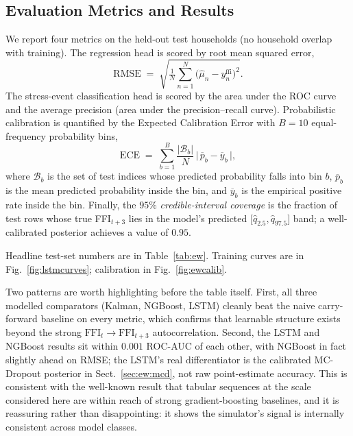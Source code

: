 \documentclass[colorlinks,balance]{asmeconf}
\begin{document}
\subsection{Evaluation Metrics and Results}\label{sec:ew:res}
We report four metrics on the held-out test households (no household overlap with training). The regression head is scored by root mean squared error,
\begin{equation}\label{eq:rmse}
\mathrm{RMSE} \;=\; \sqrt{\tfrac{1}{N}\textstyle\sum_{n=1}^{N}\!\big(\hat\mu_n - y^{\text{ffi}}_n\big)^2}.
\end{equation}
The stress-event classification head is scored by the area under the ROC curve and the average precision (area under the precision--recall curve). Probabilistic calibration is quantified by the Expected Calibration Error with $B \!=\! 10$ equal-frequency probability bins,
\begin{equation}\label{eq:ece}
\mathrm{ECE} \;=\; \sum_{b=1}^B \frac{|\mathcal{B}_b|}{N}\,\big|\,\overline{p}_{\!b} - \overline{y}_{b}\,\big|,
\end{equation}
where $\mathcal{B}_b$ is the set of test indices whose predicted probability falls into bin $b$, $\overline{p}_{\!b}$ is the mean predicted probability inside the bin, and $\overline{y}_{b}$ is the empirical positive rate inside the bin. Finally, the $95\%$ \emph{credible-interval coverage} is the fraction of test rows whose true FFI$_{t\!+\!3}$ lies in the model's predicted $\big[\hat q_{2.5}, \hat q_{97.5}\big]$ band; a well-calibrated posterior achieves a value of $0.95$.

Headline test-set numbers are in Table~\ref{tab:ew}. Training curves are in Fig.~\ref{fig:lstmcurves}; calibration in Fig.~\ref{fig:ewcalib}.

Two patterns are worth highlighting before the table itself. First, all three modelled comparators (Kalman, NGBoost, LSTM) cleanly beat the naive carry-forward baseline on every metric, which confirms that learnable structure exists beyond the strong $\mathrm{FFI}_t \!\to\! \mathrm{FFI}_{t+3}$ autocorrelation. Second, the LSTM and NGBoost results sit within $0.001$ ROC-AUC of each other, with NGBoost in fact slightly ahead on RMSE; the LSTM's real differentiator is the calibrated MC-Dropout posterior in Sect.~\ref{sec:ew:mcd}, not raw point-estimate accuracy. This is consistent with the well-known result that tabular sequences at the scale considered here are within reach of strong gradient-boosting baselines, and it is reassuring rather than disappointing: it shows the simulator's signal is internally consistent across model classes.
\end{document}
